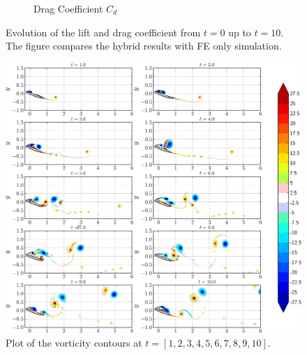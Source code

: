 \begin{figure}[!p]
\begin{subfigure}[t]{0.49\textwidth}
             \caption{Drag Coefficient $C_d$}
             \label{fig:hybrid_ellipseForce_CD}
     \end{subfigure}
     \caption{Evolution of the lift and drag coefficient from $t=0$ up to $t=10$. The figure compares the hybrid results with FE only simulation.}
     \label{fig:hybrid_ellipseForce}
	\end{figure}	

	\begin{figure}[!p]
	\centering
	\includegraphics[width=\linewidth]{./figures/validation/ellipse/hybrid_ellipse_Hybrid_contours_compressed-crop.png}
	\caption{Plot of the vorticity contours at $t=[1,2,3,4,5,6,7,8,9,10]$.}
	\label{fig:hybrid_ellipse_Hybrid_contours}
	\end{figure}



%
%

